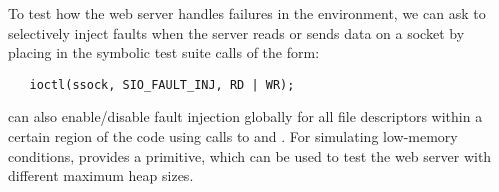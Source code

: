 To test how the web server handles failures in the environment, we can ask \cnine to selectively inject faults when the server reads or sends data on a socket by placing in the symbolic test suite calls of the form:
\begin{verbatim}
   ioctl(ssock, SIO_FAULT_INJ, RD | WR);
\end{verbatim}
\cnine can also enable/disable fault injection globally for all file descriptors within a certain region of the code using calls to  and . For simulating low-memory conditions, \cnine provides a  primitive, which can be used to test the web server with different maximum heap sizes.

